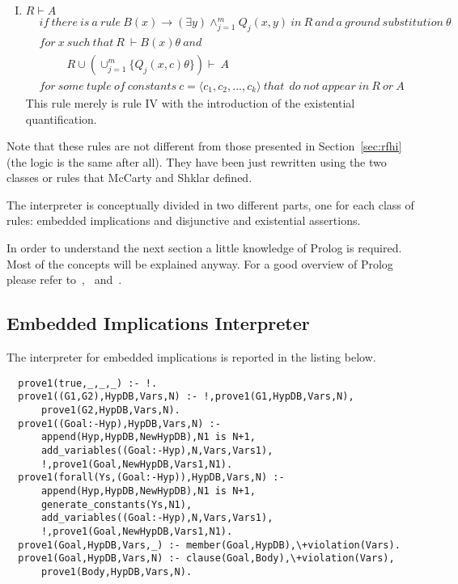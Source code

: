 \begin{enumerate}[I)]
    \item $R \vdash A$
      \begin{equation}
      \begin{split}
        &if\ there\ is\ a\ rule\ B(x) \rightarrow (\exists y)\wedge^m_{j=1}Q_j(x,y)\ in\ R\ and\ a\ ground\ substitution\ \theta\ \\
        &for\ x\ such\ that\ R\ \vdash B(x)\theta\ and\\
        &\ \ \ \ \ \ \ \ \ \ \ R \cup (\cup^m_{j=1}\{Q_j(x,c)\theta\})\vdash\ A\\
        &for\ some\ tuple\ of\ constants\ c=\langle c_1,c_2,...,c_k \rangle\ that\ \ do\ not\ appear\ in\ R\ or\ A
      \end{split}
    \end{equation}
      This rule merely is rule IV with the introduction of the existential quantification. 
\end{enumerate}

Note that these rules are not different from those presented in Section~\ref{sec:rfhi}
(the logic is the same after all). They have been just rewritten using the two classes
or rules that McCarty and Shklar defined.

The interpreter is conceptually divided in two different parts, one for each class of
rules: embedded implications and disjunctive and existential assertions.

In order to understand the next section a little knowledge of Prolog is required.
Most of the concepts will be explained anyway. For a good overview of Prolog
please refer to~\cite{Prolog1},~\cite{Prolog2} and~\cite{Prolog3}.

\subsection{Embedded Implications Interpreter}
\label{sec:eii}

The interpreter for embedded implications is reported in the listing below.

\begin{lstlisting}
  prove1(true,_,_,_) :- !.
  prove1((G1,G2),HypDB,Vars,N) :- !,prove1(G1,HypDB,Vars,N),
      prove1(G2,HypDB,Vars,N).
  prove1((Goal:-Hyp),HypDB,Vars,N) :-
      append(Hyp,HypDB,NewHypDB),N1 is N+1,
      add_variables((Goal:-Hyp),N,Vars,Vars1),
      !,prove1(Goal,NewHypDB,Vars1,N1).
  prove1(forall(Ys,(Goal:-Hyp)),HypDB,Vars,N) :-
      append(Hyp,HypDB,NewHypDB),N1 is N+1,
      generate_constants(Ys,N1),
      add_variables((Goal:-Hyp),N,Vars,Vars1),
      !,prove1(Goal,NewHypDB,Vars1,N1).
  prove1(Goal,HypDB,Vars,_) :- member(Goal,HypDB),\+violation(Vars).
  prove1(Goal,HypDB,Vars,N) :- clause(Goal,Body),\+violation(Vars),
      prove1(Body,HypDB,Vars,N).
\end{lstlisting}

